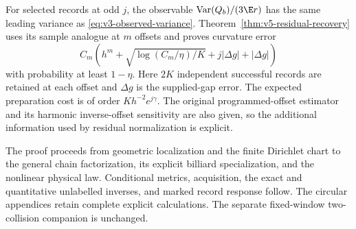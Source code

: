 For selected records at odd $j$, the observable
$\operatorname{Var}(Q_b)/(3\E r)$ has the same leading variance as
\eqref{eq:v3-observed-variance}. Theorem~\ref{thm:v5-residual-recovery}
uses its sample analogue at $m$ offsets and proves curvature error
\[
 C_m\left(h^m+\sqrt{\log(C_m/\eta)/K}
                     +j|\Delta g|+|\Delta g|\right)
\]
with probability at least $1-\eta$. Here $2K$ independent successful
records are retained at each offset and $\Delta g$ is the supplied-gap
error. The expected preparation cost is of order
$K h^{-2}e^{j\gamma}$. The original programmed-offset estimator and its
harmonic inverse-offset sensitivity are also given, so the additional
information used by residual normalization is explicit.

The proof proceeds from geometric localization and the finite
Dirichlet chart to the general chain factorization, its explicit
billiard specialization, and the nonlinear physical law. Conditional
metrics, acquisition, the exact and quantitative unlabelled inverses,
and marked record response follow. The circular appendices retain
complete explicit calculations. The separate fixed-window two-collision
companion is unchanged.
